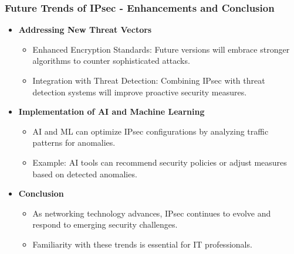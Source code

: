 \documentclass{beamer}
\begin{document}
\begin{frame}[fragile]
    \frametitle{Future Trends of IPsec - Enhancements and Conclusion}
    \begin{itemize}
        \item \textbf{Addressing New Threat Vectors}
        \begin{itemize}
            \item Enhanced Encryption Standards: Future versions will embrace stronger algorithms to counter sophisticated attacks.
            \item Integration with Threat Detection: Combining IPsec with threat detection systems will improve proactive security measures.
        \end{itemize}

        \item \textbf{Implementation of AI and Machine Learning}
        \begin{itemize}
            \item AI and ML can optimize IPsec configurations by analyzing traffic patterns for anomalies.
            \item Example: AI tools can recommend security policies or adjust measures based on detected anomalies.
        \end{itemize}

        \item \textbf{Conclusion}
        \begin{itemize}
            \item As networking technology advances, IPsec continues to evolve and respond to emerging security challenges.
            \item Familiarity with these trends is essential for IT professionals.
        \end{itemize}
    \end{itemize}
\end{frame}
\end{document}
